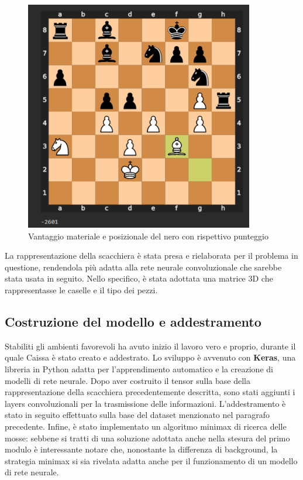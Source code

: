 \begin{figure}[!htb]
    \includegraphics[width=10cm]{frontmatter/figure/valutazione_scacchiera.pdf}
    \centering
    \caption{Vantaggio materiale e posizionale del nero con rispettivo punteggio}
    \label{fig:valutazione_scacchiera}
\end{figure}

La rappresentazione della scacchiera è stata presa e rielaborata per il problema in questione, rendendola più adatta alla rete neurale convoluzionale che sarebbe stata usata in seguito. Nello specifico, è stata adottata una matrice 3D che rappresentasse le caselle e il tipo dei pezzi.

\subsection{Costruzione del modello e addestramento}
Stabiliti gli ambienti favorevoli ha avuto inizio il lavoro vero e proprio, durante il quale Caissa è stato creato e addestrato. Lo sviluppo è avvenuto con \textbf{Keras}, una libreria in Python adatta per l'apprendimento automatico e la creazione di modelli di rete neurale. Dopo aver costruito il tensor sulla base della rappresentazione della scacchiera precedentemente descritta, sono stati aggiunti i layers convoluzionali per la trasmissione delle informazioni. L'addestramento è stato in seguito effettuato sulla base del dataset menzionato nel paragrafo precedente. Infine, è stato implementato un algoritmo minimax di ricerca delle mosse: sebbene si tratti di una soluzione adottata anche nella stesura del primo modulo è interessante notare che, nonostante la differenza di background, la strategia minimax si sia rivelata adatta anche per il funzionamento di un modello di rete neurale.

